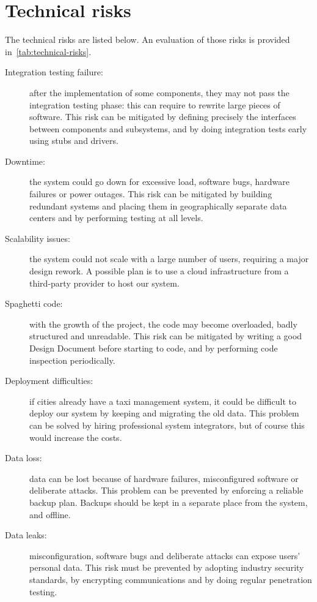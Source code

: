 \section{Technical risks}

The technical risks are listed below. An evaluation of those risks is provided in~\autoref{tab:technical-risks}.

\begin{description}

    \item[Integration testing failure:] after the implementation of some components, they may not pass the integration testing phase: this can require to rewrite large pieces of software. This risk can be mitigated by defining precisely the interfaces between components and subsystems, and by doing integration tests early using stubs and drivers.

    \item[Downtime:] the system could go down for excessive load, software bugs, hardware failures or power outages. This risk can be mitigated by building redundant systems and placing them in geographically separate data centers and by performing testing at all levels.

    \item[Scalability issues:] the system could not scale with a large number of users, requiring a major design rework. A possible plan is to use a cloud infrastructure from a third-party provider to host our system.

    \item[Spaghetti code:] with the growth of the project, the code may become overloaded, badly structured and unreadable. This risk can be mitigated by writing a good Design Document before starting to code, and by performing code inspection periodically.

    \item[Deployment difficulties:] if cities already have a taxi management system, it could be difficult to deploy our system by keeping and migrating the old data. This problem can be solved by hiring professional system integrators, but of course this would increase the costs.

    \item[Data loss:] data can be lost because of hardware failures, misconfigured software or deliberate attacks. This problem can be prevented by enforcing a reliable backup plan. Backups should be kept in a separate place from the system, and offline.

    \item[Data leaks:] misconfiguration, software bugs and deliberate attacks can expose users' personal data. This risk must be prevented by adopting industry security standards, by encrypting communications and by doing regular penetration testing.

\end{description}

